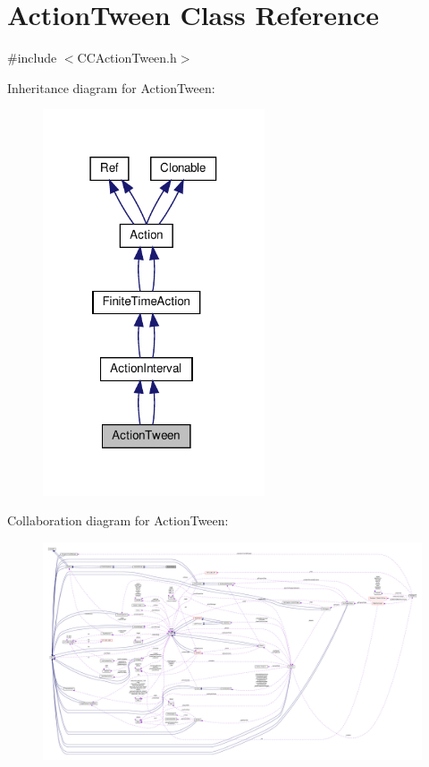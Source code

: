 \hypertarget{classActionTween}{}\section{Action\+Tween Class Reference}
\label{classActionTween}


{\ttfamily \#include $<$C\+C\+Action\+Tween.\+h$>$}



Inheritance diagram for Action\+Tween\+:
\nopagebreak
\begin{figure}[H]
\begin{center}
\leavevmode
\includegraphics[width=186pt]{classActionTween__inherit__graph}
\end{center}
\end{figure}


Collaboration diagram for Action\+Tween\+:
\nopagebreak
\begin{figure}[H]
\begin{center}
\leavevmode
\includegraphics[width=350pt]{classActionTween__coll__graph}
\end{center}
\end{figure}
